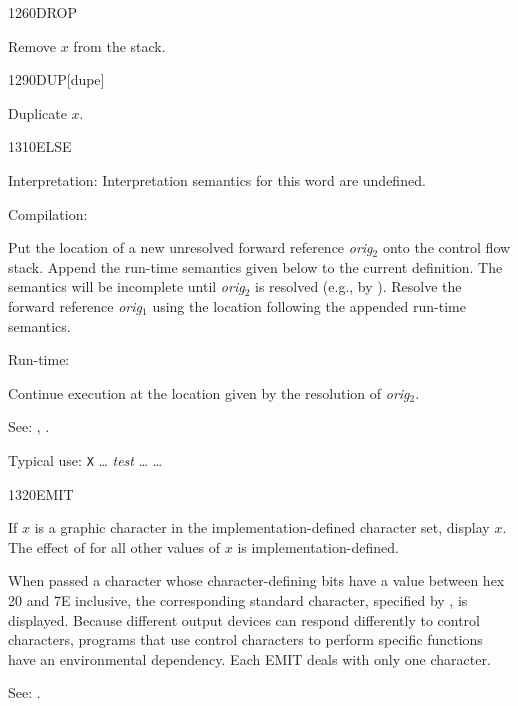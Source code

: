 \begin{newword}{1260}{DROP}

	Remove $x$ from the stack.
\end{newword}


\begin{newword}{1290}{DUP}[dupe]

	Duplicate $x$.
\end{newword}


\begin{newword*}{1310}{ELSE}
\item[Interpretation:]
	Interpretation semantics for this word are undefined.

\item[Compilation:]

	Put the location of a new unresolved forward reference
	\emph{orig}$_2$ onto the control flow stack. Append the run-time
	semantics given below to the current definition. The semantics
	will be incomplete until \emph{orig}$_2$ is resolved (e.g., by
	). Resolve the forward reference \emph{orig}$_1$ using
	the location following the appended run-time semantics.

\item[Run-time:]
	\stack{}{}

	Continue execution at the location given by the resolution of
	\emph{orig}$_2$.

\item[See:]
	,
	.

	\begin{rationale} %
		Typical use:
			\word{:} \texttt{X} {\ldots}
				\emph{test}  {\ldots}
				 {\ldots} 
			\word{;}
	\end{rationale}
\end{newword*}


\begin{newword}{1320}{EMIT}

	If $x$ is a graphic character in the implementation-defined
	character set, display $x$. The effect of  for all
	other values of $x$ is implementation-defined.

	When passed a character whose character-defining bits have a
	value between hex 20 and 7E inclusive, the corresponding
	standard character, specified by , is displayed. Because different output
	devices can respond differently to control characters, programs
	that use control characters to perform specific functions have
	an environmental dependency. Each EMIT deals with only one
	character.

\item[See:]
	.
\end{newword}


